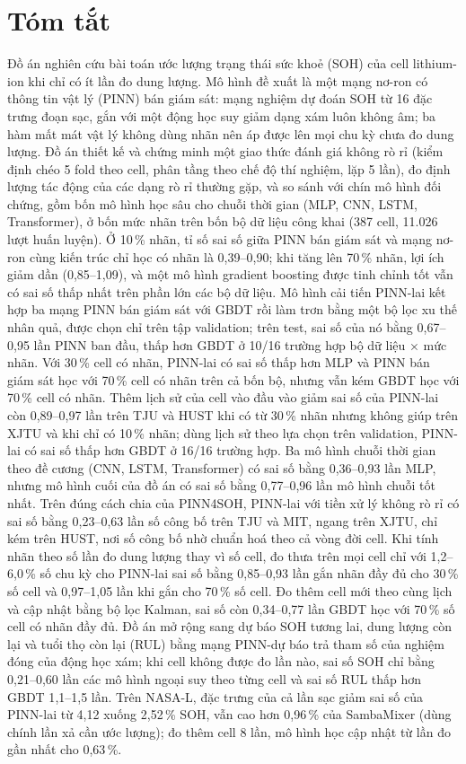 \documentclass[12pt,a4paper,oneside]{report}
\theoremstyle{plain}
\theoremstyle{definition}
\begin{document}
\chapter*{Tóm tắt}
Đồ án nghiên cứu bài toán ước lượng trạng thái sức khoẻ (SOH) của cell lithium-ion khi chỉ có ít lần đo dung lượng.
Mô hình đề xuất là một mạng nơ-ron có thông tin vật lý (PINN) bán giám sát: mạng nghiệm dự đoán SOH từ 16 đặc trưng
đoạn sạc, gắn với một động học suy giảm dạng xám luôn không âm; ba hàm mất mát vật lý không dùng nhãn nên áp được lên
mọi chu kỳ chưa đo dung lượng. Đồ án thiết kế và chứng minh một giao thức đánh giá không rò rỉ (kiểm định chéo 5 fold
theo cell, phân tầng theo chế độ thí nghiệm, lặp 5 lần), đo định lượng tác động của các dạng rò rỉ thường gặp, và so
sánh với chín mô hình đối chứng, gồm bốn mô hình học sâu cho chuỗi thời gian (MLP, CNN, LSTM, Transformer), ở bốn mức nhãn trên bốn bộ dữ liệu công khai (387 cell, 11.026 lượt huấn
luyện). Ở 10\,\% nhãn, tỉ số sai số giữa PINN bán giám sát và mạng nơ-ron cùng kiến trúc chỉ học có nhãn là 0{,}39--0{,}90;
khi tăng lên 70\,\% nhãn, lợi ích giảm dần (0{,}85--1{,}09), và một mô hình gradient boosting được tinh chỉnh tốt vẫn có sai số thấp nhất trên phần lớn các bộ dữ liệu. Mô hình cải tiến PINN-lai kết hợp ba mạng PINN bán giám sát với GBDT rồi làm trơn bằng một bộ lọc xu thế nhân
quả, được chọn chỉ trên tập validation; trên test, sai số của nó bằng 0{,}67--0{,}95 lần PINN ban đầu, thấp hơn GBDT ở
10/16 trường hợp bộ dữ liệu × mức nhãn. Với 30\,\% cell có nhãn, PINN-lai có sai số thấp hơn MLP và PINN bán giám
sát học với 70\,\% cell có nhãn trên cả bốn bộ, nhưng vẫn kém GBDT học với 70\,\% cell có nhãn. Thêm lịch sử của cell vào đầu vào giảm sai số của
PINN-lai còn 0{,}89--0{,}97 lần trên TJU và HUST khi có từ 30\,\% nhãn nhưng không giúp trên XJTU và khi chỉ có 10\,\% nhãn; dùng
lịch sử theo lựa chọn trên validation, PINN-lai có sai số thấp hơn GBDT ở 16/16 trường hợp. Ba mô hình chuỗi thời gian theo đề cương (CNN, LSTM, Transformer) có sai số bằng 0{,}36--0{,}93 lần MLP, nhưng mô hình cuối của đồ án có sai số bằng 0{,}77--0{,}96 lần mô hình chuỗi tốt nhất. Trên đúng cách chia của PINN4SOH, PINN-lai với tiền xử lý không rò rỉ có
sai số bằng 0{,}23--0{,}63 lần số công bố trên TJU và MIT, ngang trên XJTU, chỉ kém trên HUST, nơi số công bố nhờ chuẩn hoá theo cả vòng đời cell. Khi tính nhãn theo số lần đo dung lượng thay vì số cell, đo thưa trên mọi cell chỉ với 1{,}2--6{,}0\,\% số chu kỳ
cho PINN-lai sai số bằng 0{,}85--0{,}93 lần gắn nhãn đầy đủ cho 30\,\% số cell và 0{,}97--1{,}05 lần khi gắn cho 70\,\% số cell. Đo thêm cell mới theo cùng lịch và cập nhật bằng bộ lọc Kalman, sai số còn 0{,}34--0{,}77 lần GBDT học với
70\,\% số cell có nhãn đầy đủ. Đồ án mở rộng sang dự báo SOH tương lai, dung lượng còn lại và tuổi thọ còn lại (RUL) bằng
mạng PINN-dự báo trả tham số của nghiệm đóng của động học xám; khi cell không được đo lần nào, sai số SOH chỉ bằng 0{,}21--0{,}60
lần các mô hình ngoại suy theo từng cell và sai số RUL thấp hơn GBDT 1{,}1--1{,}5 lần. Trên NASA-L, đặc trưng của cả lần sạc giảm sai số của PINN-lai từ 4{,}12 xuống 2{,}52\,\% SOH, vẫn cao hơn 0{,}96\,\% của SambaMixer (dùng chính lần xả cần ước lượng); đo thêm cell 8 lần, mô hình học cập nhật từ lần đo gần nhất cho 0{,}63\,\%.
\end{document}
